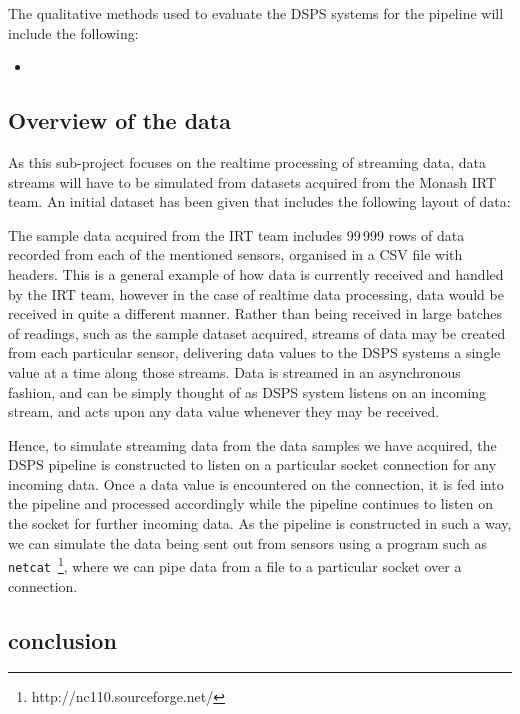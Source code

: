 The qualitative methods used to evaluate the DSPS systems for the pipeline will include the following:

\begin{itemize}
  \item
\end{itemize}





\subsection{Overview of the data} %
\label{sub:overview_of_the_data}

As this sub-project focuses on the realtime processing of streaming data, data streams will have to be simulated from
datasets acquired from the Monash IRT team. An initial dataset has been given that includes the following layout of data:


The sample data acquired from the IRT team includes 99\,999 rows of data recorded from each of the mentioned sensors,
organised in a CSV file with headers. This is a general example of how data is currently received and handled by the IRT
team, however in the case of realtime data processing, data would be received in quite a different manner. Rather than
being received in large batches of readings, such as the sample dataset acquired, streams of data may be created from
each particular sensor, delivering data values to the DSPS systems a single value at a time along those streams. Data
is streamed in an asynchronous fashion, and can be simply thought of as DSPS system listens on an incoming stream, and
acts upon any data value whenever they may be received.

Hence, to simulate streaming data from the data samples we have acquired, the DSPS pipeline is constructed to listen on
a particular socket connection for any incoming data. Once a data value is encountered on the connection, it is fed into
the pipeline and processed accordingly while the pipeline continues to listen on the socket for further incoming data.
As the pipeline is constructed in such a way, we can simulate the data being sent out from sensors using a program such
as \texttt{netcat}~\footnote{http://nc110.sourceforge.net/}, where we can pipe data from a file to a particular
socket over a connection.


\subsection{conclusion} %
\label{sub:conclusion}

